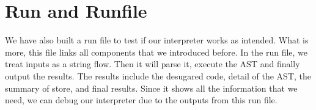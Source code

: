 \section{Run and Runfile}
We have also built a run file to test if our interpreter works as intended. What is more, this file links all components that we introduced before. In the run file, we treat inputs as a string flow. Then it will parse it, execute the AST and finally output the results. The results include the desugared code, detail of the AST, the summary of store, and final results. Since it shows all the information that we need, we can debug our interpreter due to the outputs from this run file.
